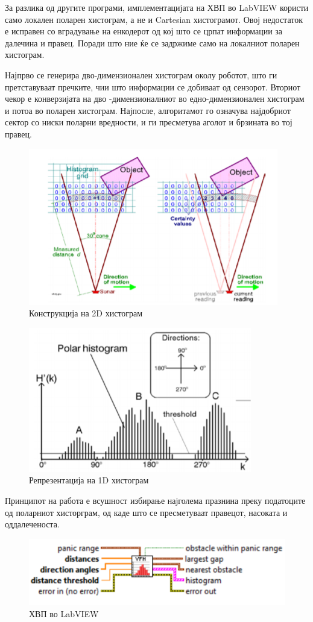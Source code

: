 \documentclass{article}
\begin{document}
За разлика од другите програми, имплементацијата на ХВП во LabVIEW користи само локален поларен хистограм, а не и Cartesian хистограмот. Овој недостаток е исправен со вградување на енкодерот од кој што се црпат информации за далечина и правец. Поради што ние ќе се задржиме само на локалниот поларен хистограм.

Најпрво се генерира дво-димензионален хистограм околу роботот, што ги претставуваат пречките, чии што информации се добиваат од сензорот. Вториот чекор е конверзијата на дво -димензионалниот во едно-димензионален хистограм и потоа во поларен хистограм. Најпосле, алгоритамот го означува најдобриот сектор со ниски поларни вредности, и ги пресметува аголот и брзината во тој правец.

\begin{figure}[H]
\centering
\includegraphics[width=0.35\linewidth]{2d_his.png}
\caption{Конструкција на 2D хистограм}
\label{fig:2d_his.png}
\end{figure}

\begin{figure}[H]
\centering
\includegraphics[width=0.35\linewidth]{1d_his.png}
\caption{Репрезентација на 1D хистограм}
\label{fig:1d_his.png}
\end{figure}

Принципот на работа е всушност избирање најголема празнина преку податоците од поларниот хисторграм, од каде што се пресметуваат правецот, насоката и оддалеченоста.

\begin{figure}[H]
\centering
\includegraphics[width=0.5\linewidth]{vfh_lv.png}
\caption{ХВП во LabVIEW}
\label{fig:vfh_lv.png}
\end{figure}
\end{document}
